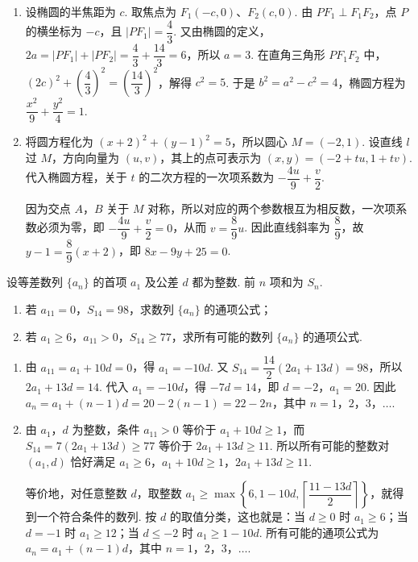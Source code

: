 \begin{solution}
\begin{enumerate}
\item 设椭圆的半焦距为 \(c\). 取焦点为 \(F_1(-c,0)\)、\(F_2(c,0)\). 由 \(PF_1\perp F_1F_2\)，点 \(P\) 的横坐标为 \(-c\)，且 \(|PF_1|=\dfrac43\). 又由椭圆的定义，
\(2a=|PF_1|+|PF_2|=\dfrac43+\dfrac{14}{3}=6\)，所以 \(a=3\). 在直角三角形 \(PF_1F_2\) 中，\((2c)^2+\left(\dfrac43\right)^2=\left(\dfrac{14}{3}\right)^2\)，解得 \(c^2=5\). 于是 \(b^2=a^2-c^2=4\)，椭圆方程为 \(\dfrac{x^2}{9}+\dfrac{y^2}{4}=1\).
\item 将圆方程化为 \((x+2)^2+(y-1)^2=5\)，所以圆心 \(M=(-2,1)\). 设直线 \(l\) 过 \(M\)，方向向量为 \((u,v)\)，其上的点可表示为 \((x,y)=(-2+tu,1+tv)\). 代入椭圆方程，关于 \(t\) 的二次方程的一次项系数为 \(-\dfrac{4u}{9}+\dfrac{v}{2}\).

因为交点 \(A\)，\(B\) 关于 \(M\) 对称，所以对应的两个参数根互为相反数，一次项系数必须为零，即 \(-\dfrac{4u}{9}+\dfrac{v}{2}=0\)，从而 \(v=\dfrac89u\). 因此直线斜率为 \(\dfrac89\)，故 \(y-1=\dfrac89(x+2)\)，即 \(8x-9y+25=0\).
\end{enumerate}
\end{solution}

\begin{problem}
设等差数列 \(\{a_{n}\}\) 的首项 \(a_1\) 及公差 \(d\) 都为整数. 前 \(n\) 项和为 \(S_{n}\).

\begin{enumerate}
\item 若 \(a_{11} = 0\)，\(S_{14} = 98\)，求数列 \(\{a_n\}\) 的通项公式；
\item 若 \(a_1 \geqslant 6\)，\(a_{11} > 0\)，\(S_{14} \geqslant 77\)，求所有可能的数列 \(\{a_n\}\) 的通项公式.
\end{enumerate}
\end{problem}

\begin{solution}
\begin{enumerate}
\item 由 \(a_{11}=a_1+10d=0\)，得 \(a_1=-10d\). 又
\(S_{14}=\dfrac{14}{2}(2a_1+13d)=98\)，所以 \(2a_1+13d=14\). 代入 \(a_1=-10d\)，得 \(-7d=14\)，即 \(d=-2\)，\(a_1=20\). 因此
\(a_n=a_1+(n-1)d=20-2(n-1)=22-2n\)，其中 \(n=1\)，\(2\)，\(3\)，\(\ldots\).
\item 由 \(a_1\)，\(d\) 为整数，条件 \(a_{11}>0\) 等价于 \(a_1+10d\geqslant1\)，而
\(S_{14}=7(2a_1+13d)\geqslant77\) 等价于 \(2a_1+13d\geqslant11\). 所以所有可能的整数对 \((a_1,d)\) 恰好满足 \(a_1\geqslant6\)，\(a_1+10d\geqslant1\)，\(2a_1+13d\geqslant11\).

等价地，对任意整数 \(d\)，取整数 \(a_1\geqslant\max\left\{6,1-10d,\left\lceil\dfrac{11-13d}{2}\right\rceil\right\}\)，就得到一个符合条件的数列. 按 \(d\) 的取值分类，这也就是：当 \(d\geqslant0\) 时 \(a_1\geqslant6\)；当 \(d=-1\) 时 \(a_1\geqslant12\)；当 \(d\leqslant-2\) 时 \(a_1\geqslant1-10d\). 所有可能的通项公式为
\(a_n=a_1+(n-1)d\)，其中 \(n=1\)，\(2\)，\(3\)，\(\ldots\).
\end{enumerate}
\end{solution}
